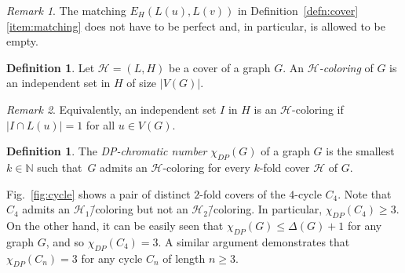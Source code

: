 \documentclass[11pt, reqno, psamsfonts]{amsart}
\theoremstyle{definition}
\newtheorem{defn}[theo]{Definition}
\newtheorem*{exmp}{Example}
\theoremstyle{remark}
\newtheorem*{remk}{Remark}
\newcommand{\0}{\varnothing}
\newcommand{\N}{\mathbb{N}}
\renewcommand{\leq}{\leqslant}
\renewcommand{\geq}{\geqslant}
\newcommand{\Cov}[1]{\mathscr{#1}}
\numberwithin{equation}{section}
\begin{document}
	\begin{remk}
		The matching $E_H(L(u), L(v))$ in Definition~\ref{defn:cover}\ref{item:matching} does not have to be perfect and, in particular, is allowed to be empty.
	\end{remk}
	
	
	
	\begin{defn}
		Let $\Cov{H} = (L, H)$ be a cover of a graph $G$. An \emph{$\Cov{H}$-coloring} of $G$ is an independent set in $H$ of size $|V(G)|$.
	\end{defn}
	
	\begin{remk}\label{remk:single}
		Equivalently, an independent set $I$ in $H$ is an $\Cov{H}$-coloring if $|I \cap L(u)| = 1$ for all $u \in V(G)$.
	\end{remk}
	
	\begin{defn}
		The \emph{DP-chromatic number} $\chi_{DP}(G)$ of a graph $G$ is the smallest $k \in \N$ such that~$G$ admits an $\Cov{H}$-coloring for every $k$-fold cover $\Cov{H}$ of $G$.
	\end{defn}
	
	Fig.~\ref{fig:cycle} shows a pair of distinct $2$-fold covers of the $4$-cycle $C_4$. Note that $C_4$ admits an $\Cov{H}_1$\=/coloring but not an $\Cov{H}_2$\=/coloring. In particular, $\chi_{DP}(C_4) \geq 3$. On the other hand, it can be easily seen that $\chi_{DP}(G) \leq \Delta(G) + 1$ for any graph $G$, and so $\chi_{DP}(C_4) = 3$. A similar argument demonstrates that $\chi_{DP}(C_n) = 3$ for any cycle $C_n$ of length $n \geq 3$.
	
\end{document}
